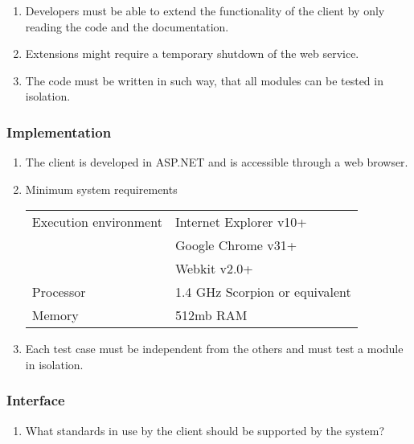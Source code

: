 \begin{enumerate}[label=\textbf{NFR-\twodigits*}, resume]
\item Developers must be able to extend the functionality of the client by only reading the code and the documentation.
\item Extensions might require a temporary shutdown of the web service.
\item The code must be written in such way, that all modules can be tested in isolation.
\end{enumerate}

\subsubsection{Implementation}
\begin{enumerate}[label=\textbf{NFR-\twodigits*}, resume]
\item The client is developed in ASP.NET and is accessible through a web browser.
\item Minimum system requirements


\begin{tabular}{| l | l | }
\hline
 Execution environment & Internet Explorer v10+\\
& Google Chrome v31+\\
& Webkit v2.0+\\ \hline
 Processor & 1.4 GHz Scorpion or equivalent \\ \hline
 Memory & 512mb RAM  \\ \hline

\end{tabular}

\item Each test case must be independent from the others and must test a module in isolation.
\end{enumerate}

\subsubsection{Interface}

\begin{enumerate}[label=\textbf{NFR-\twodigits*}, resume]
\item {\color{red}What standards in use by the client should be supported by the system?}
\end{enumerate}

%
